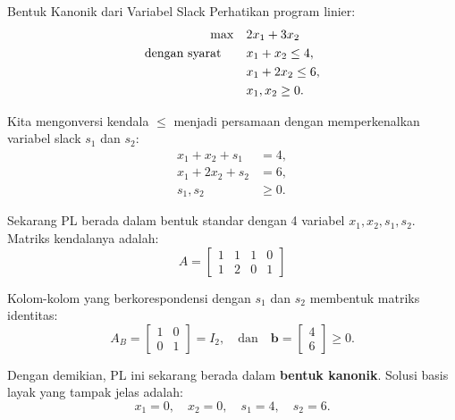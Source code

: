 \begin{example}{Bentuk Kanonik dari Variabel Slack}\label{exa:canonical-slack}
Perhatikan program linier:
\[
\begin{aligned}
\max \quad & 2x_1 + 3x_2 \\
\mbox{dengan syarat}\quad \quad 
& x_1 + x_2 \leq 4, \\
& x_1 + 2x_2 \leq 6, \\
& x_1, x_2 \geq 0.
\end{aligned}
\]

Kita mengonversi kendala \( \leq \) menjadi persamaan dengan memperkenalkan variabel slack \( s_1 \) dan \( s_2 \):
\[
\begin{aligned}
x_1 + x_2 + s_1 &= 4, \\
x_1 + 2x_2 + s_2 &= 6, \\
s_1, s_2 &\geq 0.
\end{aligned}
\]

Sekarang PL berada dalam bentuk standar dengan 4 variabel \( x_1, x_2, s_1, s_2 \). Matriks kendalanya adalah:
\[
A = \begin{bmatrix}
1 & 1 & 1 & 0 \\
1 & 2 & 0 & 1
\end{bmatrix}
\]

Kolom-kolom yang berkorespondensi dengan \( s_1 \) dan \( s_2 \) membentuk matriks identitas:
\[
A_B = \begin{bmatrix}
1 & 0 \\
0 & 1
\end{bmatrix}
= I_2,
\quad \text{dan} \quad
\mathbf{b} = \begin{bmatrix} 4 \\ 6 \end{bmatrix} \geq 0.
\]

Dengan demikian, PL ini sekarang berada dalam \textbf{bentuk kanonik}. Solusi basis layak yang tampak jelas adalah:
\[
x_1 = 0, \quad x_2 = 0, \quad s_1 = 4, \quad s_2 = 6.
\]
\end{example}

